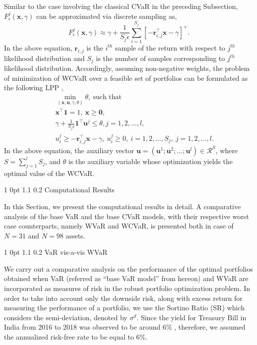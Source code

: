 \documentclass[12pt]{article}
\makeatletter
\numberwithin{equation}{section}
\renewcommand{\section}{
  \@startsection
  {section}%
  {1}%
  {0pt}%
  {1.1\baselineskip}%
  {0.2\baselineskip}%
  {\sc \centering}%
}
\renewcommand{\subsection}{
  \@startsection
  {subsection}%
  {1}%
  {0pt}%
  {1.1\baselineskip}%
  {0.2\baselineskip}%
  {\sc \centering}%
}
\makeatother
\begin{document}
Similar to the case involving the classical CVaR in the preceding Subsection, $\displaystyle{F_{\epsilon}^{j}(\mathbf{x},\gamma)}$
can be approximated via discrete sampling as,
\begin{equation}
F_{\epsilon}^{j}(\mathbf{x},\gamma) \approx \gamma+\frac{1}{S_{j}\epsilon}\sum\limits_{i=1}^{S_{j}}
\left[-\mathbf{r}_{i,j}^{\top}\mathbf{x}-\gamma\right]^{+}.
\label{eq:6.10}
\end{equation}
In the above equation, $\mathbf{r}_{i,j}$ is the $i^{th}$ sample of the return with respect to $j^{th}$ likelihood distribution and $S_{j}$ is the
number of samples corresponding to $j^{th}$ likelihood distribution. Accordingly, assuming non-negative weights, the problem of minimization of WCVaR over a feasible set of portfolios can be formulated as the following LPP \cite{Zhu},
\begin{eqnarray}
&& \min_{(\mathbf{x},\mathbf{u},\gamma,\theta)} \theta,~\text{such that} \nonumber \\
&& \mathbf{x}^{\top}\mathbf{1}=1,~\mathbf{x} \geq \mathbf{0}, \nonumber \\
&& \gamma + \frac{1}{S_{j} \epsilon} \mathbf{1}^{\top}\mathbf{u}^{j} \leq \theta, j=1,2,\dots,l, \nonumber \\
&& u_{i}^{j} \geq-\mathbf{r}_{i,j}^{\top}\mathbf{x}-\gamma,~u_{i}^{j} \geq 0,~i=1,2,\dots,S_{j},~j=1,2,\dots,l.
\label{eq:6.11}
\end{eqnarray}
In the above equation, the auxiliary vector $\mathbf{u}=(\mathbf{u}^{1};\mathbf{u}^{2};\dots; \mathbf{u}^{l}) \in \mathcal{R}^{S}$, where $\displaystyle{S=\sum\limits_{j=1}^{l}S_{j}}$, and $\theta$ is the auxiliary variable whose optimization yields the optimal value of the WCVaR.

\section{Computational Results}
\label{Computational_Results}

In this Section, we present the computational results in detail. A comparative analysis of the base VaR and the base CVaR models, with their respective worst case counterparts,
namely WVaR and WCVaR, is presented both in case of $N=31$ and $N=98$ assets.

\subsection{VaR vis-a-vis WVaR}

We carry out a comparative analysis on the performance of the optimal portfolios obtained when VaR (referred as ``base VaR model'' from hereon) and WVaR are incorporated as measures of risk in the robust portfolio optimization problem. In order to take into account only the downside risk, along with excess return for measuring the performance of a portfolio, we use the Sortino Ratio (SR) which considers the semi-deviation, denoted by $\sigma^{d}$. Since the yield for Treasury Bill in India from 2016 to 2018 was observed to be around $6\%$ \cite{Rbi}, therefore, we assumed the annualized risk-free rate to be equal to $6\%$.
\end{document}
